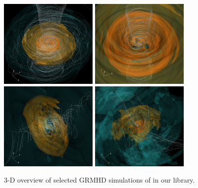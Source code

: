 \begin{figure}
  \centering
  \includegraphics[width=0.425\textwidth]{figures/sane_3D.png}\hspace{1.5pt}%
  \includegraphics[width=0.425\textwidth]{figures/mad_3D_new.png}\\
  \includegraphics[width=0.425\textwidth]{figures/tilted_3D.png}\hspace{1.5pt}%
  \includegraphics[width=0.425\textwidth]{figures/ressler_3D_new.png}
  \caption{3-D overview of selected GRMHD simulations of \sgra in our library.
}
\end{figure}
